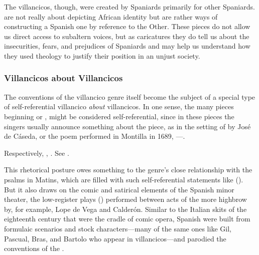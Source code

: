 
The villancicos, though, were created by Spaniards primarily for other Spaniards.
 are not really about depicting African identity but
are rather ways of constructing a Spanish one by reference to the Other.
These pieces do not allow us direct access to subaltern voices, but as
caricatures they do tell us about the insecurities, fears, and prejudices of
Spaniards and may help us understand how they used theology to justify their
position in an unjust society.%
    \Autocites
    [See also][]{Bloechl:RaceEmpire}
    {LoweEarle:BlackAfricansRenaissance}


\subsubsection{Villancicos about Villancicos}

The conventions of the villancico genre itself become the subject of a special
type of self-referential villancico \emph{about} villancicos.
In one sense, the many pieces beginning  or , might be considered self-referential, since in these pieces the
singers usually announce something about the piece, as in the setting of
 by José de Cáseda, or the poem performed in
Montilla in 1689, ---.%
\begin{Footnote}
    Respectively, , \autocite[116 (no signature
    listed)]{BNE:VCs17C}.
    See \autocite{LeGuin:Tonadilla}.
\end{Footnote}
This rhetorical posture owes something to the genre's close
relationship with the psalms in Matins, which are filled with such
self-referential statements like 
().
But it also draws on the comic and satirical elements of the Spanish minor
theater, the low-register plays () performed between acts of
the more highbrow  by, for example, Lope de Vega and Calderón.%
    \Autocite{Cotarelo:Entremeses}
Similar to the Italian  skits of the eighteenth
century that were the cradle of comic opera, Spanish  were
built from formulaic scenarios and stock characters---many of the same ones
like Gil, Pascual, Bras, and Bartolo who appear in villancicos---and parodied
the conventions of the .

